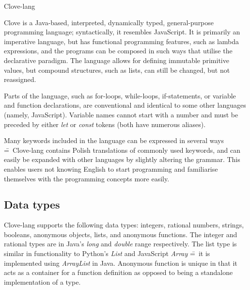 \documentclass[12pt,a4paper]{article}
\begin{document}
\begin{center}
  \Huge {Clove-lang}
\end{center}

\noindent Clove is a Java-based, interpreted, dynamically typed, general-purpose programming language; syntactically, it resembles JavaScript. It is primarily an imperative language, but has functional programming features, such as lambda expressions, and the programs can be composed in such ways that utilise the declarative paradigm. The language allows for defining immutable primitive values, but compound structures, such as lists, can still be changed, but not reassigned.\par


Parts of the language, such as for-loops, while-loops, if-statements, or variable and function declarations, are conventional and identical to some other languages (namely, JavaScript). Variable names cannot start with a number and must be preceded by either \emph{let} or \emph{const} tokens (both have numerous aliases).\par

Many keywords included in the language can be expressed in several ways \==~Clove-lang contains Polish translations of commonly used keywords, and can easily be expanded with other languages by slightly altering the grammar. This enables users not knowing English to start programming and familiarise themselves with the programming concepts more easily.



\subsection*{Data types}


Clove-lang supports the following data types: integers, rational numbers, strings, booleans, anonymous objects, lists, and anonymous functions. The integer and rational types are in Java's \emph{long} and \emph{double} range respectively. The list type is similar in functionality to Python's \emph{List} and JavaScript \emph{Array} \==~it is implemented using \emph{ArrayList} in Java. Anonymous function is unique in that it acts as a container for a function definition as opposed to being a standalone implementation of a type.\par
\end{document}
